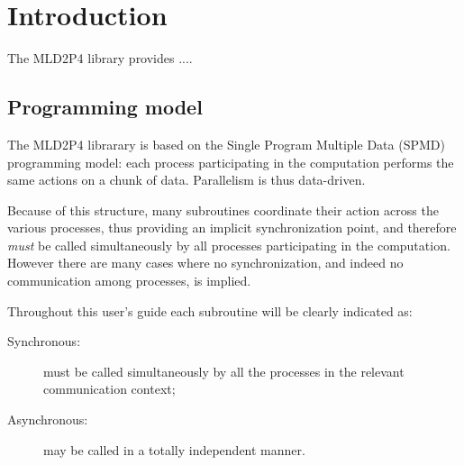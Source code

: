 \section{Introduction}\label{sec:intro}

The MLD2P4 library provides ....


\subsection{Programming model}

The MLD2P4 librarary is based on the Single Program Multiple Data
(SPMD) programming model: each process participating in the
computation performs the same actions on a chunk of data. Parallelism
is thus data-driven. 

Because of this structure, many subroutines coordinate their action
across the various processes, thus providing an implicit
synchronization point, and therefore \emph{must} be
called simultaneously by all processes participating in the
computation. 
However there are many cases where no synchronization, and indeed no
communication among processes, is implied. 

Throughout this user's guide each subroutine will be clearly indicated
as:
\begin{description}
\item[Synchronous:] must be called simultaneously by all the
  processes in the relevant communication context;
\item[Asynchronous:] may be called in a totally independent manner.
\end{description}

